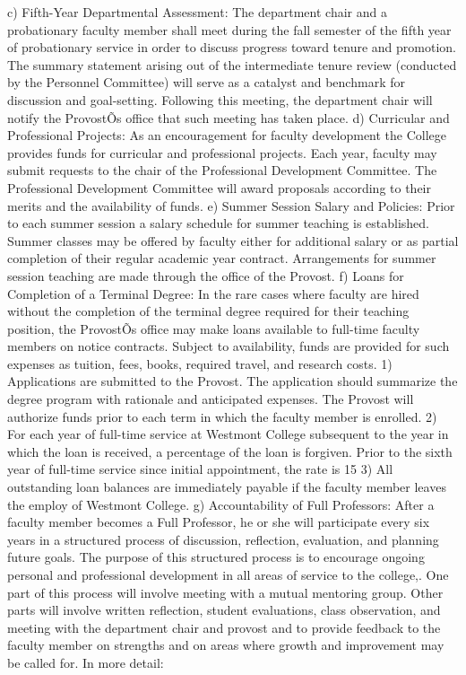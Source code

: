 \documentclass[letterpaper, 11pt]{article}
\begin{document}
c) Fifth-Year Departmental Assessment:  The department chair and a probationary faculty member shall meet during the fall semester of the fifth year of probationary service in order to discuss progress toward tenure and promotion.  The summary statement arising out of the intermediate tenure review (conducted by the Personnel Committee) will serve as a catalyst and benchmark for discussion and goal-setting.  Following this meeting, the department chair will notify the ProvostÕs office that such meeting has taken place.
d) Curricular and Professional Projects:  As an encouragement for faculty development the College provides funds for curricular and professional projects.  Each year, faculty may submit requests to the chair of the Professional Development Committee. The Professional Development Committee will award proposals according to their merits and the availability of funds.
e) Summer Session Salary and Policies:  Prior to each summer session a salary schedule for summer teaching is established.  Summer classes may be offered by faculty either for additional salary or as partial completion of their regular academic year contract. Arrangements for summer session teaching are made through the office of the Provost.
f) Loans for Completion of a Terminal Degree:  In the rare cases where faculty are hired without the completion of the terminal degree required for their teaching position, the ProvostÕs office may make loans available to full-time faculty members on notice contracts. Subject to availability, funds are provided for such expenses as tuition, fees, books, required travel, and research costs.
1) Applications are submitted to the Provost.  The application should summarize the degree program with rationale and anticipated expenses.  The Provost will authorize funds prior to each term in which the faculty member is enrolled.
2) For each year of full-time service at Westmont College subsequent to the year in which the loan is received, a percentage of the loan is forgiven.  Prior to the sixth year of full-time service since initial appointment, the rate is 15%
3) All outstanding loan balances are immediately payable if the faculty member leaves the employ of Westmont College.
g) Accountability of Full Professors:  After a faculty member becomes a Full Professor, he or she will participate every six years in a structured process of discussion, reflection, evaluation, and planning future goals. The purpose of this structured process is to encourage ongoing personal and professional development in all areas of service to the college,. One part of this process will involve meeting with a mutual mentoring group. Other parts will involve written reflection, student evaluations, class observation, and meeting with the department chair and provost and to provide feedback to the faculty member on strengths and on areas where growth and improvement may be called for. In more detail: 
\end{document}
